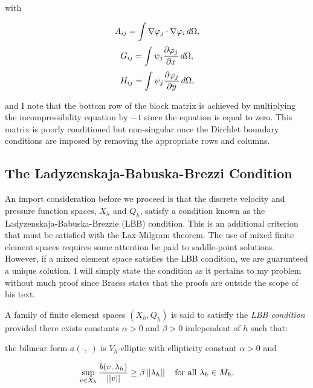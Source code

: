 \documentclass[12pt]{article}
\begin{document}
with

\begin{equation}
    A_{ij} = \int \nabla \varphi_j \cdot \nabla \varphi_i \,d\Omega,
\end{equation}
\begin{equation}
    G_{ij} = \int \psi_j \frac{\partial \varphi_j}{\partial x} \,d\Omega,
\end{equation}
\begin{equation}
    H_{ij} = \int \psi_j \frac{\partial \varphi_j}{\partial y} \,d\Omega,
\end{equation}

and I note that the bottom row of the block matrix is achieved by multiplying
the incompressibility equation by $-1$ since the equation is equal to zero.
This matrix is poorly conditioned but non-singular once the Dirchlet boundary
conditions are imposed by removing the appropriate rows and columns.

\subsection{The Ladyzenskaja-Babuska-Brezzi Condition}

An import consideration before we proceed is that the discrete velocity and
pressure function spaces, $X_h$ and $Q_h$, satisfy a condition known as the
Ladyzenskaja-Babuska-Brezzie (LBB) condition. This is an additional criterion
that must be satisfied with the Lax-Milgram theorem. The use of mixed finite
element spaces requires some attention be paid to saddle-point solutions.
However, if a mixed element space satisfies the LBB condition, we are
guarunteed a unique solution.  I will simply state the condition as it pertains
to my problem without much proof since Braess\cite{br} states that the proofs
are outside the scope of his text.

\begin{defn}
    A family of finite element spaces $(X_h, Q_h)$ is said to satisffy the
    \textit{LBB condition} provided there exists constants $\alpha > 0$ and
    $\beta > 0$ independent of $h$ such that:

    the bilinear form $a(\cdot, \cdot)$ is $V_h$-elliptic with
    ellipticity constant $\alpha > 0$ and

    \[ \sup_{v \in X_h} \frac{b(v, \lambda_h)}{\left|\left|v\right|\right|} \geq \beta
        \left|\left|\lambda_h\right|\right| \quad \text{for all }\lambda_h \in M_h.  \]

    \end{defn}
\end{document}
